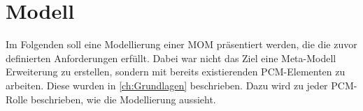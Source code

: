 


\section{Modell}
\label{sec:modell}
Im Folgenden soll eine Modellierung einer MOM präsentiert werden, die die zuvor definierten Anforderungen erfüllt. Dabei war nicht das Ziel eine Meta-Modell Erweiterung zu erstellen, sondern mit bereits existierenden PCM-Elementen zu arbeiten. Diese wurden in \autoref{ch:Grundlagen} beschrieben. Dazu wird zu jeder PCM-Rolle beschrieben, wie die Modellierung aussieht.


